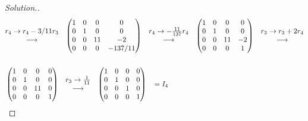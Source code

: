 \documentclass[11pt,a4paper]{article}
\theoremstyle{definition}
\newenvironment{solution}
  {\renewcommand{\qedsymbol}{}\begin{proof}[\textit{Solution}.]}
  {\end{proof}}
\begin{document}
\begin{solution}
\begin{align*}
&
\begin{matrix}
r_4\rightarrow r_4-3/11r_3\\ \longrightarrow\\
\end{matrix}
\hspace{0.3cm}
\begin{pmatrix}
1&0&0&0\\0&1&0&0\\0&0&11&-2\\0&0&0&-137/11\\
\end{pmatrix}
\hspace{0.3cm}
\begin{matrix}
r_4\rightarrow -\frac{11}{137}r_4\\ \longrightarrow\\
\end{matrix}
\hspace{0.3cm}
\begin{pmatrix}
1&0&0&0\\0&1&0&0\\0&0&11&-2\\0&0&0&1\\
\end{pmatrix}
\hspace{0.3cm}
\begin{matrix}
r_3\rightarrow r_3+2r_4\\ \longrightarrow\\
\end{matrix}\\\\
&
\begin{pmatrix}
1&0&0&0\\0&1&0&0\\0&0&11&0\\0&0&0&1\\
\end{pmatrix}
\hspace{0.3cm}
\begin{matrix}
r_3\rightarrow \frac{1}{11}\\ \longrightarrow\\
\end{matrix}
\hspace{0.3cm}
\begin{pmatrix}
1&0&0&0\\0&1&0&0\\0&0&1&0\\0&0&0&1\\
\end{pmatrix}
\hspace{0.3cm} = I_4\\
\end{align*}
\end{solution}
\end{document}
